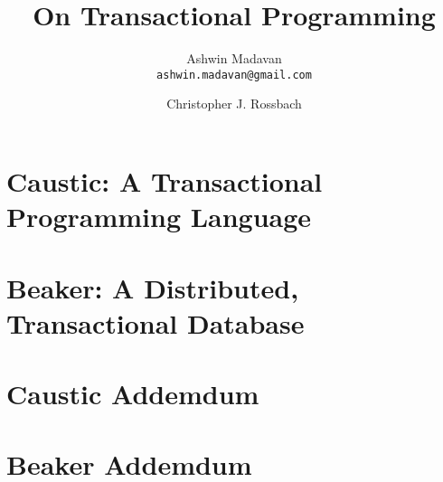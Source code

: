 \documentclass[12pt]{report}
\begin{document}
\title{On Transactional Programming\vspace{-2ex}}
\author{
  Ashwin Madavan\\
  \texttt{ashwin.madavan@gmail.com}
  \and
  Christopher J. Rossbach\\
}
\maketitle



\tableofcontents

\chapter{Caustic: A Transactional Programming Language}


\chapter{Beaker: A Distributed, Transactional Database}


\appendix
\chapter{Caustic Addemdum}


\chapter{Beaker Addemdum}


\printbibliography
\end{document}
